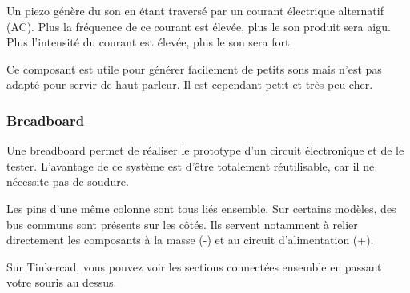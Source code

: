 Un piezo génère du son en étant traversé par un courant électrique alternatif (AC).
Plus la fréquence de ce courant est élevée, plus le son produit sera aigu.
Plus l'intensité du courant est élevée, plus le son sera fort.

Ce composant est utile pour générer facilement de petits sons mais n'est pas adapté pour servir de haut-parleur.
Il est cependant petit et très peu cher.


\subsubsection{Breadboard}

Une breadboard permet de réaliser le prototype d'un circuit électronique et de le tester. L'avantage de ce système est d'être totalement réutilisable, car il ne nécessite pas de soudure.

Les pins d'une même colonne sont tous liés ensemble.
Sur certains modèles, des bus communs sont présents sur les côtés.
Ils servent notamment à relier directement les composants à la masse (-) et au circuit d'alimentation (+).

Sur Tinkercad, vous pouvez voir les sections connectées ensemble en passant votre souris au dessus.

